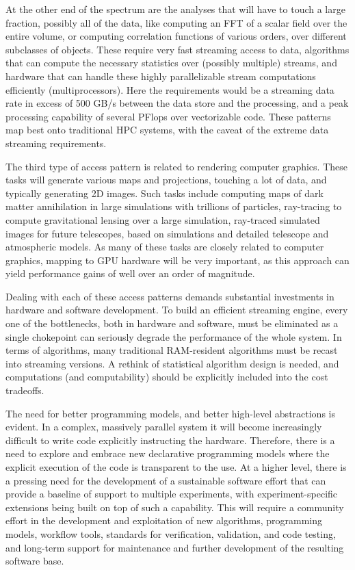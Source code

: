 At the other end of the spectrum are the analyses that will have to
touch a large fraction, possibly all of the data, like computing an
FFT of a scalar field over the entire volume, or computing correlation
functions of various orders, over different subclasses of
objects. These require very fast streaming access to data, algorithms
that can compute the necessary statistics over (possibly multiple)
streams, and hardware that can handle these highly parallelizable
stream computations efficiently (multiprocessors). Here the
requirements would be a streaming data rate in excess of 500 GB/s
between the data store and the processing, and a peak processing
capability of several PFlops over vectorizable code. These patterns
map best onto traditional HPC systems, with the caveat of the extreme
data streaming requirements.

The third type of access pattern is related to rendering computer
graphics. These tasks will generate various maps and projections,
touching a lot of data, and typically generating 2D images. Such tasks
include computing maps of dark matter annihilation in large
simulations with trillions of particles, ray-tracing to compute
gravitational lensing over a large simulation, ray-traced simulated
images for future telescopes, based on simulations and detailed
telescope and atmospheric models. As many of these tasks are closely
related to computer graphics, mapping to GPU hardware will be very
important, as this approach can yield performance gains of well over
an order of magnitude.

Dealing with each of these access patterns demands substantial
investments in hardware and software development. To build an
efficient streaming engine, every one of the bottlenecks, both in
hardware and software, must be eliminated as a single chokepoint can
seriously degrade the performance of the whole system. In terms of
algorithms, many traditional RAM-resident algorithms must be recast
into streaming versions. A rethink of statistical algorithm design is
needed, and computations (and computability) should be explicitly
included into the cost tradeoffs.

The need for better programming models, and better high-level
abstractions is evident. In a complex, massively parallel system it
will become increasingly difficult to write code explicitly
instructing the hardware. Therefore, there is a need to explore and
embrace new declarative programming models where the explicit
execution of the code is transparent to the use. At a higher level,
there is a pressing need for the development of a sustainable software
effort that can provide a baseline of support to multiple experiments,
with experiment-specific extensions being built on top of such a
capability. This will require a community effort in the development
and exploitation of new algorithms, programming models, workflow
tools, standards for verification, validation, and code testing, and
long-term support for maintenance and further development of the
resulting software base.

